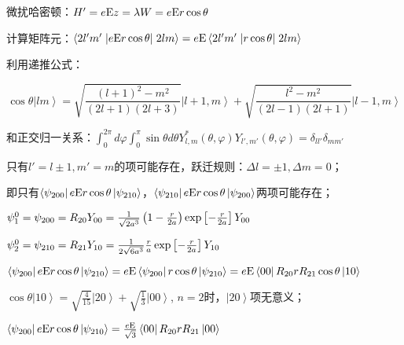 微扰哈密顿：$H' = e{\rm E}z = \lambda W = e{\rm E}r\cos \theta $

计算矩阵元：$\left\langle {2l'm'} \right.\left| {e{\rm E}r\cos \theta } \right|\left. {2lm} \right\rangle  = e{\rm E}\left\langle {2l'm'} \right.\left| {r\cos \theta } \right|\left. {2lm} \right\rangle $

利用递推公式：

\begin{equation}
\cos \theta \left| {lm} \right\rangle  = \sqrt {\frac{{(l + 1)^2  - m^2 }}{{(2l + 1)(2l + 3)}}} \left| {l + 1,m} \right\rangle  + \sqrt {\frac{{l^2  - m^2 }}{{(2l - 1)(2l + 1)}}} \left| {l - 1,m} \right\rangle 
\end{equation}

和正交归一关系：$\int_0^{2\pi } {d\varphi \int_0^\pi  {\sin \theta d\theta Y_{l,m}^* (\theta ,\varphi )Y_{l',m'} (\theta ,\varphi )} }  = \delta _{ll'} \delta _{mm'} $


只有$l' = l \pm 1,m' = m$的项可能存在，跃迁规则：$\Delta l =  \pm 1,\Delta m = 0$；


即只有$\left\langle {\psi _{200} } \right|e{\rm E}r\cos \theta
\left| {\psi _{210} } \right\rangle $，$\left\langle {\psi _{210} }
\right|e{\rm E}r\cos \theta \left| {\psi _{200} } \right\rangle
$两项可能存在；


$\psi _1^0  = \psi _{200}  = R_{20} Y_{00}  = \frac{1}{{\sqrt {2a^3 } }}\left( {1 - \frac{r}{{2a}}} \right)\exp \left[ { - {\textstyle{r \over {2a}}}} \right]Y_{00} $


$\psi _2^0  = \psi _{210}  = R_{21} Y_{10}  = \frac{1}{{2\sqrt {6a^3 } }}\frac{r}{a}\exp \left[ { - {\textstyle{r \over {2a}}}} \right]Y_{10} $



$\left\langle {\psi _{200} } \right|e{\rm E}r\cos \theta \left| {\psi _{210} } \right\rangle  = e{\rm E}\left\langle {\psi _{200} } \right|r\cos \theta \left| {\psi _{210} } \right\rangle  = e{\rm E}\left\langle {00} \right|R_{20} rR_{21} \cos \theta \left| {10} \right\rangle $



$\cos \theta \left| {10} \right\rangle  = \sqrt {\frac{4}{{15}}} \left| {20} \right\rangle  + \sqrt {\frac{1}{3}} \left| {00} \right\rangle $, $n=2$时，$\left| {20} \right\rangle $项无意义；

$\left\langle {\psi _{200} } \right|e{\rm E}r\cos \theta \left| {\psi _{210} } \right\rangle  = \frac{{e{\rm E}}}{{\sqrt 3 }}\left\langle {00} \right|R_{20} rR_{21} \left| {00} \right\rangle $


